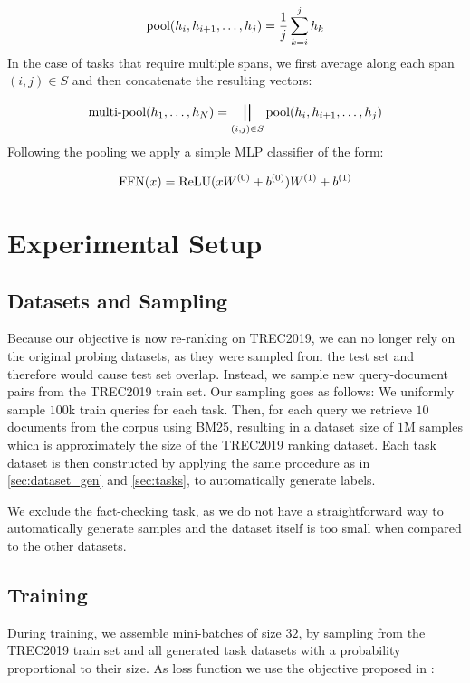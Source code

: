 \begin{equation}
    \text{pool}(h_i, h_{i+1},\dots, h_j)= \frac{1}{j} \sum_{k=i}^j h_k
\end{equation}
In the case of tasks that require multiple spans, we first average along each span $(i,j) \in S$ and then concatenate the resulting vectors:

\begin{equation}
    \text{multi-pool}(h_1, \dots, h_N) = \bigparallel_{(i, j) \in S}{\text{pool}(h_i, h_{i+1},\dots, h_j)}
\end{equation}
Following the pooling we apply a simple MLP classifier of the form:

\begin{equation}
    \text{FFN}(x) = \text{ReLU}(x W^{(0)} + b^{(0)}) W^{(1)} + b^{(1)}
\end{equation}


\section{Experimental Setup}
\subsection{Datasets and Sampling}
Because our objective is now re-ranking on TREC2019, we can no longer rely on the original probing datasets, as they were sampled from the test set and therefore would cause test set overlap. Instead, we sample new query-document pairs from the TREC2019 train set. Our sampling goes as follows: We uniformly sample $100$k train queries for each task. Then, for each query we retrieve $10$ documents from the corpus using BM25, resulting in a dataset size of $1$M samples which is approximately the size of the TREC2019 ranking dataset. Each task dataset is then constructed by applying the same procedure as in \autoref{sec:dataset_gen} and \autoref{sec:tasks}, to automatically generate labels.

We exclude the fact-checking task, as we do not have a straightforward way to automatically generate samples and the dataset itself is too small when compared to the other datasets.

\subsection{Training}
During training, we assemble mini-batches of size $32$, by sampling from the TREC2019 train set and all generated task datasets with a probability proportional to their size. As loss function we use the objective proposed in \cite{aghajanyan-etal-2021-muppet}:

